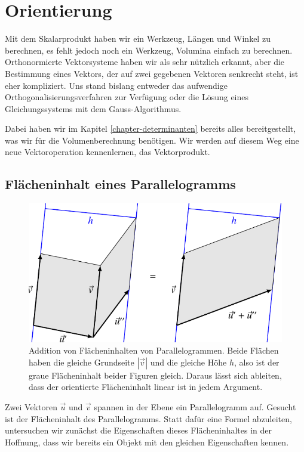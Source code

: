 %
%
%
\section{Orientierung}
Mit dem Skalarprodukt haben wir ein Werkzeug, Längen und Winkel zu berechnen,
es fehlt jedoch noch ein Werkzeug, Volumina einfach zu berechnen.
Orthonormierte
Vektorsysteme haben wir als sehr nützlich erkannt, aber die Bestimmung eines
Vektors, der auf zwei gegebenen Vektoren senkrecht steht, ist eher kompliziert.
Uns stand bislang entweder das
aufwendige Orthogonalisierungsverfahren zur Verfügung oder die Lösung
eines Gleichungssystems mit dem Gauss-Algorithmus.

Dabei haben wir im Kapitel \ref{chapter-determinanten} bereits alles
bereitgestellt, was wir für die Volumenberechnung benötigen.
Wir werden auf diesem Weg eine neue Vektoroperation kennenlernen,
das Vektorprodukt.

\subsection{Flächeninhalt eines Parallelogramms}
\begin{figure}
\begin{center}
\includegraphics{5/images/flaeche.pdf}
\end{center}
\caption{Addition von Flächeninhalten von Parallelogrammen.
Beide Flächen haben die gleiche Grundseite $|\vec{v}|$ und die gleiche
Höhe $h$, also ist der graue Flächeninhalt beider Figuren gleich.
Daraus lässt sich ableiten, dass der orientierte Flächeninhalt linear
ist in jedem Argument.
\label{image-flaeche-addition}}
\end{figure}
Zwei Vektoren $\vec u$ und $\vec v$ spannen in der Ebene ein Parallelogramm
auf.
Gesucht ist der Flächeninhalt des Parallelogramms.
Statt dafür eine
Formel abzuleiten, untersuchen wir zunächst die Eigenschaften dieses
Flächeninhaltes in der Hoffnung, dass wir bereits ein Objekt mit den
gleichen Eigenschaften kennen.

